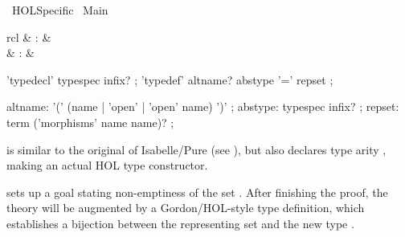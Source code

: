 %
\begin{isabellebody}%
\def\isabellecontext{HOL{\isacharunderscore}Specific}%
%
\isadelimtheory
\isanewline
\isanewline
%
\endisadelimtheory
%
\isatagtheory
{}\isamarkupfalse%
\ HOL{\isacharunderscore}Specific\isanewline
{}\ Main\isanewline
{}%
\endisatagtheory
{\isafoldtheory}%
%
\isadelimtheory
%
\endisadelimtheory
%
\isamarkuptrue%
%
\isamarkuptrue%
%
\begin{isamarkuptext}%
\begin{matharray}{rcl}
    \hypertarget{command.HOL.typedecl}{\hyperlink{command.HOL.typedecl}{\mbox{}}} & : &  \\
    \hypertarget{command.HOL.typedef}{\hyperlink{command.HOL.typedef}{\mbox{}}} & : &  \\
  \end{matharray}

  \begin{rail}
    'typedecl' typespec infix?
    ;
    'typedef' altname? abstype '=' repset
    ;

    altname: '(' (name | 'open' | 'open' name) ')'
    ;
    abstype: typespec infix?
    ;
    repset: term ('morphisms' name name)?
    ;
  \end{rail}

  \begin{descr}
  
  \item [\hyperlink{command.HOL.typedecl}{\mbox{\isa{\isacommand{typedecl}}}}~\isa{{\isachardoublequote}{\isacharparenleft}{\isasymalpha}\isactrlsub {\isadigit{1}}{\isacharcomma}\ {\isasymdots}{\isacharcomma}\ {\isasymalpha}\isactrlsub n{\isacharparenright}\ t{\isachardoublequote}}] is similar to the original \hyperlink{command.typedecl}{\mbox{}} of
  Isabelle/Pure (see ), but also declares type
  arity , making  an
  actual HOL type constructor.   %
  
  \item [\hyperlink{command.HOL.typedef}{\mbox{\isa{\isacommand{typedef}}}}~\isa{{\isachardoublequote}{\isacharparenleft}{\isasymalpha}\isactrlsub {\isadigit{1}}{\isacharcomma}\ {\isasymdots}{\isacharcomma}\ {\isasymalpha}\isactrlsub n{\isacharparenright}\ t\ {\isacharequal}\ A{\isachardoublequote}}] sets up a goal stating non-emptiness of the set .
  After finishing the proof, the theory will be augmented by a
  Gordon/HOL-style type definition, which establishes a bijection
  between the representing set  and the new type .
  

\end{descr}
\end{isamarkuptext}
\end{isabellebody}
